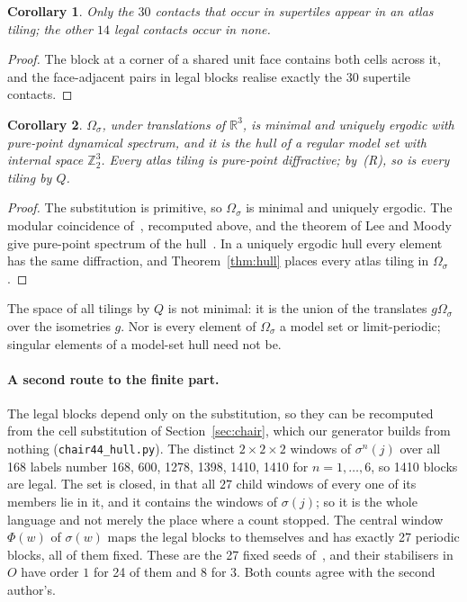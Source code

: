 \documentclass[11pt]{article}
\newtheorem{cor}{Corollary}
\theoremstyle{definition}
\theoremstyle{remark}
\newcommand{\code}[1]{\texttt{#1}}
\begin{document}
\begin{cor}
\label{cor:contacts}
Only the $30$ contacts that occur in supertiles appear in an atlas tiling; the other $14$ legal contacts occur in none.
\end{cor}

\begin{proof}
The block at a corner of a shared unit face contains both cells across it, and the face-adjacent pairs in legal blocks
realise exactly the $30$ supertile contacts.
\end{proof}

\begin{cor}
\label{cor:hull}
$\Omega_{\sigma}$, under translations of $\mathbb{R}^{3}$, is minimal and uniquely ergodic with pure-point dynamical spectrum,
and it is the hull of a regular model set with internal space $\mathbb{Z}_{2}^{3}$.  Every atlas tiling is pure-point
diffractive; by~(R), so is every tiling by $Q$.
\end{cor}

\begin{proof}
The substitution is primitive, so $\Omega_{\sigma}$ is minimal and uniquely ergodic.  The modular coincidence
of~\cite[Thm~8.1]{Tsiokos1}, recomputed above, and the theorem of Lee and Moody~\cite{LeeMoody} give pure-point spectrum of
the hull~\cite{LMS}.  In a uniquely ergodic hull every element has the same diffraction, and Theorem~\ref{thm:hull} places
every atlas tiling in $\Omega_{\sigma}$.
\end{proof}

\noindent
The space of all tilings by $Q$ is not minimal: it is the union of the translates $g\Omega_{\sigma}$ over the isometries $g$.
Nor is every element of $\Omega_{\sigma}$ a model set or limit-periodic; singular elements of a model-set hull need not be.

\paragraph{A second route to the finite part.}  The legal blocks depend only on the substitution, so they can be recomputed
from the cell substitution of Section~\ref{sec:chair}, which our generator builds from nothing
(\code{chair44\_hull.py}).  The distinct $2\times2\times2$ windows of $\sigma^{n}(j)$ over all 168 labels number
168, 600, 1278, 1398, 1410, 1410 for $n=1,\dots,6$, so 1410 blocks are legal.  The set is closed, in that all $27$ child windows of every one of
its members lie in it, and it contains the windows of $\sigma(j)$; so it is the whole language and not merely the place
where a count stopped.  The central window $\Phi(w)$ of $\sigma(w)$ maps the legal blocks to themselves and has exactly
27 periodic blocks, all of them fixed.  These are the 27 fixed seeds of~\cite{Tsiokos1}, and their stabilisers in
$O$ have order $1$ for 24 of them and $8$ for 3.  Both counts agree with the second author's.
\end{document}
